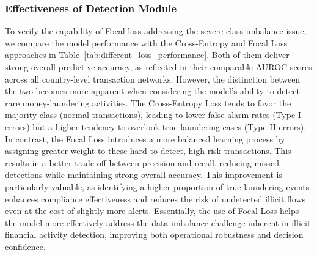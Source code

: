 \subsubsection{Effectiveness of Detection Module} 
To verify the capability of Focal loss addressing the severe class imbalance issue, we compare the model performance with the Cross-Entropy and Focal Loss approaches in Table~\ref{tab:different_loss_performance}. Both of them deliver strong overall predictive accuracy, as reflected in their comparable AUROC scores across all country-level transaction networks. However, the distinction between the two becomes more apparent when considering the model’s ability to detect rare money-laundering activities. The Cross-Entropy Loss tends to favor the majority class (normal transactions), leading to lower false alarm rates (Type I errors) but a higher tendency to overlook true laundering cases (Type II errors). In contrast, the Focal Loss introduces a more balanced learning process by assigning greater weight to these hard-to-detect, high-risk transactions. This results in a better trade-off between precision and recall, reducing missed detections while maintaining strong overall accuracy. This improvement is particularly valuable, as identifying a higher proportion of true laundering events enhances compliance effectiveness and reduces the risk of undetected illicit flows even at the cost of slightly more alerts. Essentially, the use of Focal Loss helps the model more effectively address the data imbalance challenge inherent in illicit financial activity detection, improving both operational robustness and decision confidence.


